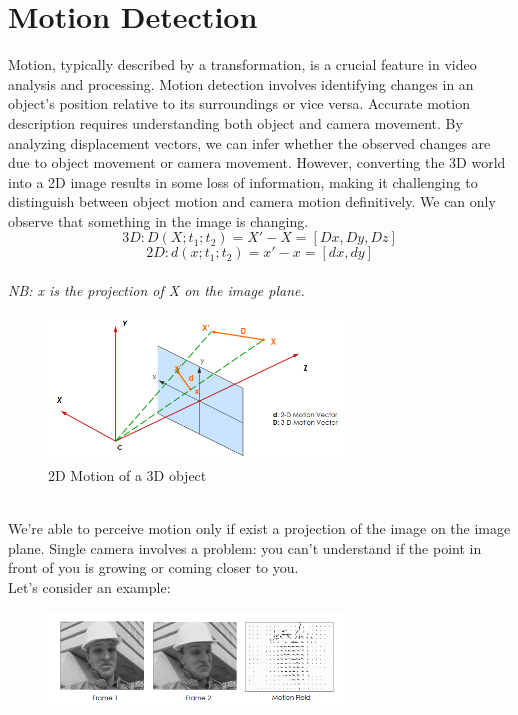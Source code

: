 \chapter{Motion Detection}
Motion, typically described by a transformation, is a crucial feature in video analysis and processing. 
Motion detection involves identifying changes in an object's position relative to its surroundings or vice versa.
Accurate motion description requires understanding both object and camera movement. 
By analyzing displacement vectors, we can infer whether the observed changes are due to object movement or camera movement. 
However, converting the 3D world into a 2D image results in some loss of information, making it challenging to distinguish between object motion and camera motion definitively. 
We can only observe that something in the image is changing.
\\
\[3D: D(X; t_1; t_2) = X' - X = [Dx, Dy, Dz]\]
\[2D: d(x; t_1; t_2) = x' - x = [dx, dy]\]
\\ \textit{NB: x is the projection of X on the image plane.}
\begin{figure}[h]
    \centering
    \includegraphics[width=0.7\textwidth]{Figures/2DMotion.png}
    \caption{2D Motion of a 3D object}
\end{figure}
\\We're able to perceive motion only if exist a projection of the image on the image plane. Single camera involves a problem: you can't understand if the point in front of you is growing or coming closer to you.
\\Let's consider an example: 
\begin{figure}[h]
    \centering
    \includegraphics[width=0.7\textwidth]{Figures/Example.png}
\end{figure}\\

